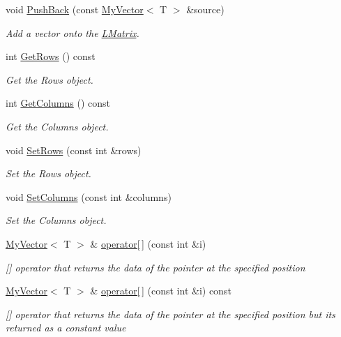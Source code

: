 \begin{DoxyCompactItemize}
void \mbox{\hyperlink{class_matrix_controller_a5f5411f7f84c53bb02b4f4febb3c4089}{Push\+Back}} (const \mbox{\hyperlink{class_my_vector}{My\+Vector}}$<$ T $>$ \&source)
\begin{DoxyCompactList}\small\item\em Add a vector onto the \mbox{\hyperlink{class_l_matrix}{L\+Matrix}}. \end{DoxyCompactList}\item 
int \mbox{\hyperlink{class_matrix_controller_a3cf741ea77589aae6557b691f4e4c3bb}{Get\+Rows}} () const
\begin{DoxyCompactList}\small\item\em Get the Rows object. \end{DoxyCompactList}\item 
int \mbox{\hyperlink{class_matrix_controller_a2d895a5b210bfc295308f97084e78002}{Get\+Columns}} () const
\begin{DoxyCompactList}\small\item\em Get the Columns object. \end{DoxyCompactList}\item 
void \mbox{\hyperlink{class_matrix_controller_ad659b02670dce5a4d1e6a1b73ca63513}{Set\+Rows}} (const int \&rows)
\begin{DoxyCompactList}\small\item\em Set the Rows object. \end{DoxyCompactList}\item 
void \mbox{\hyperlink{class_matrix_controller_a6e68e5f2260f1d80afc5891c60301927}{Set\+Columns}} (const int \&columns)
\begin{DoxyCompactList}\small\item\em Set the Columns object. \end{DoxyCompactList}\item 
\mbox{\hyperlink{class_my_vector}{My\+Vector}}$<$ T $>$ \& \mbox{\hyperlink{class_matrix_controller_a944709b73c0cf4d0b962eb26840a896a}{operator\mbox{[}$\,$\mbox{]}}} (const int \&i)
\begin{DoxyCompactList}\small\item\em \mbox{[}\mbox{]} operator that returns the data of the pointer at the specified position \end{DoxyCompactList}\item 
\mbox{\hyperlink{class_my_vector}{My\+Vector}}$<$ T $>$ \& \mbox{\hyperlink{class_matrix_controller_a59cfd6e10abd1a90fa0a1090bb4de240}{operator\mbox{[}$\,$\mbox{]}}} (const int \&i) const
\begin{DoxyCompactList}\small\item\em \mbox{[}\mbox{]} operator that returns the data of the pointer at the specified position but its returned as a constant value \end{DoxyCompactList}\item 

\end{DoxyCompactItemize}
